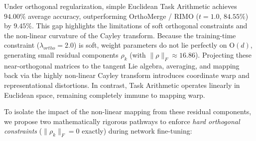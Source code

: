 Under orthogonal regularization, simple Euclidean Task Arithmetic achieves $94.00\%$ average accuracy, outperforming OrthoMerge / RIMO ($t=1.0$, $84.55\%$) by $9.45\%$. This gap highlights the limitations of soft orthogonal constraints and the non-linear curvature of the Cayley transform. Because the training-time constraint ($\lambda_{ortho} = 2.0$) is soft, weight parameters do not lie perfectly on $\mathrm{O}(d)$, generating small residual components $\rho_k$ (with $\|\rho\|_F \approx 16.86$). Projecting these near-orthogonal matrices to the tangent Lie algebra, averaging, and mapping back via the highly non-linear Cayley transform introduces coordinate warp and representational distortions. In contrast, Task Arithmetic operates linearly in Euclidean space, remaining completely immune to mapping warp.

To isolate the impact of the non-linear mapping from these residual components, we propose two mathematically rigorous pathways to enforce \emph{hard orthogonal constraints} ($\|\rho_k\|_F = 0$ exactly) during network fine-tuning:


